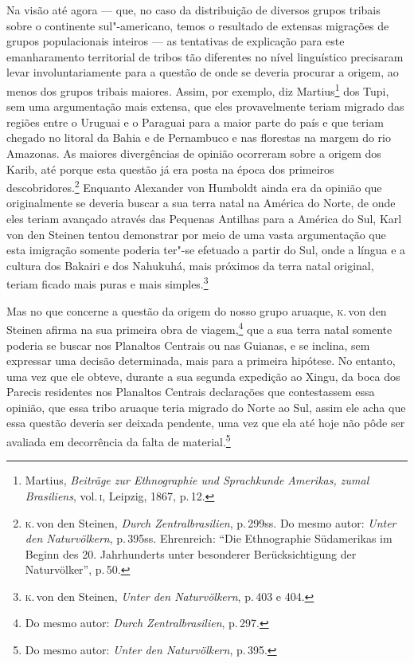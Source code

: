 Na visão até agora --- que, no caso da distribuição de diversos grupos
tribais sobre o continente sul"-americano, temos o resultado de extensas
migrações de grupos populacionais inteiros --- as tentativas de
explicação para este emanharamento territorial de tribos tão diferentes 
no nível linguístico precisaram levar involuntariamente para
a questão de onde se deveria procurar a origem, ao menos dos grupos
tribais maiores. Assim, por exemplo, diz Martius\footnote{Martius,
  \textit{Beiträge zur Ethnographie und Sprachkunde Amerikas, zumal
  Brasiliens}, vol.\,\textsc{i}, Leipzig, 1867, p.\,12.} dos Tupi, sem uma
argumentação mais extensa, que eles provavelmente teriam migrado das regiões
entre o Uruguai e o Paraguai para a maior parte do país e que teriam chegado
no litoral da Bahia e de Pernambuco e nas florestas na margem do rio
Amazonas. As maiores divergências de opinião ocorreram sobre a origem
dos Karib, até porque esta questão já era posta na época dos primeiros
descobridores.\footnote{\textsc{k}.\,von den Steinen, \textit{Durch
  Zentralbrasilien}, p.\,299ss. Do mesmo autor: \textit{Unter den
  Naturvölkern}, p.\,395ss. Ehrenreich: ``Die Ethnographie Südamerikas
  im Beginn des 20. Jahrhunderts unter besonderer Berücksichtigung der
  Naturvölker'', p.\,50.} Enquanto Alexander von Humboldt ainda
era da opinião que originalmente se deveria buscar a sua terra natal na
América do Norte, de onde eles teriam avançado através das Pequenas
Antilhas para a América do Sul, Karl von den Steinen tentou demonstrar
por meio de uma vasta argumentação que esta imigração somente poderia
ter"-se efetuado a partir do Sul, onde a língua e a cultura dos Bakairi e
dos Nahukuhá, mais próximos da terra natal original, teriam ficado
mais puras e mais simples.\footnote{\textsc{k}.\,von den Steinen, \textit{Unter den
  Naturvölkern}, p.\,403 e 404.}

Mas no que concerne a questão da origem do nosso grupo aruaque, \textsc{k}.\,von
den Steinen afirma na sua primeira obra de viagem,\footnote{Do mesmo
  autor: \textit{Durch Zentralbrasilien}, p.\,297.} que a sua terra natal
somente poderia se buscar nos Planaltos Centrais ou nas Guianas, e se
inclina, sem expressar uma decisão determinada, mais para a primeira
hipótese. No entanto, uma vez que ele obteve, durante a sua segunda
expedição ao Xingu, da boca dos Parecis residentes nos Planaltos
Centrais declarações que contestassem essa opinião, que essa tribo
aruaque teria migrado do Norte ao Sul, assim ele acha que essa questão
deveria ser deixada pendente, uma vez que ela até hoje não pôde ser
avaliada em decorrência da falta de material.\footnote{Do mesmo autor:
  \textit{Unter den Naturvölkern}, p.\,395.}

